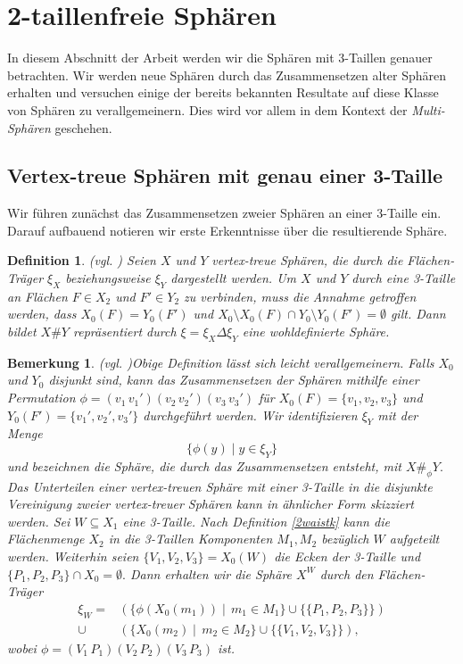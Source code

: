 \documentclass[12pt,titlepage,twoside,cleardoublepage]{article}
\theoremstyle{nummermitklammern}
\newtheorem{definition}[temp]{Definition}
\newtheorem{bemerkung}[temp]{Bemerkung}
\newtheorem{definition}[zahl]{Definition}
\newtheorem{bemerkung}[zahl]{Bemerkung}
\numberwithin{equation}{section}
\begin{document}
 \section{2-taillenfreie Sphären}
In diesem Abschnitt der Arbeit werden wir die Sphären mit 3-Taillen genauer betrachten. Wir werden neue Sphären durch das Zusammensetzen alter Sphären erhalten und versuchen einige der bereits bekannten Resultate auf diese Klasse von Sphären zu verallgemeinern. Dies wird vor allem in dem Kontext der \emph{Multi-Sphären} geschehen.
\subsection{Vertex-treue Sphären mit genau einer 3-Taille}
Wir führen zunächst das Zusammensetzen zweier Sphären an einer 3-Taille ein. Darauf aufbauend notieren wir erste Erkenntnisse über die resultierende Sphäre. 
\begin{definition}{\textsc{(}vgl. \textsc{\cite{simp})}}
Seien $X$ und $Y$ vertex-treue Sphären, die durch die Flächen-Träger $\xi_X$ beziehungsweise $\xi_Y$ dargestellt werden. Um $X$ und $Y$ durch eine 3-Taille an Flächen $F\in X_2$ und $F'\in Y_2$ zu verbinden, muss die Annahme getroffen werden, dass
$X_0(F)=Y_0(F')$ und $X_0\setminus X_0(F)\cap Y_0\setminus Y_0(F')=\emptyset$ gilt. Dann bildet $X\#Y$ repräsentiert durch $\xi=\xi_X \Delta \xi_Y$ eine wohldefinierte Sphäre.
\end{definition}
\begin{bemerkung}{\textsc{(}vgl. \textsc{\cite{simp})}}\label{3waist}
Obige Definition lässt sich leicht verallgemeinern. Falls $X_0$ und $Y_0$ disjunkt sind, kann das Zusammensetzen der Sphären mithilfe einer Permutation $\phi=(v_1\,v_1')(v_2\,v_2')(v_3\,v_3')$ für $X_0(F)=\{v_1,v_2,v_3\}$ und $Y_0(F')=\{v_1',v_2',v_3'\}$ durchgeführt werden. Wir identifizieren $\xi_Y$ mit der Menge  
\[
\{\phi (y)\mid y\in \xi_Y \}
\]
und bezeichnen die Sphäre, die durch das Zusammensetzen  entsteht, mit $X\#_{\phi}Y.$\\
Das Unterteilen einer vertex-treuen Sphäre mit einer 3-Taille in die disjunkte Vereinigung zweier vertex-treuer Sphären kann in ähnlicher Form skizziert werden. Sei $W\subseteq X_1$ eine 3-Taille. Nach Definition \ref{2waistk} kann die Flächenmenge $X_2$ in die 3-Taillen Komponenten $M_1,M_2$ bezüglich $W$ aufgeteilt werden. Weiterhin seien $\{V_1,V_2,V_3\}=X_0(W)$ die Ecken der 3-Taille und $\{P_1,P_2,P_3\}\cap X_0=\emptyset.$ Dann erhalten wir die Sphäre $X^W$ durch den Flächen-Träger 
\begin{align*}
\xi_W=&(\{\phi(X_0(m_1))\mid \, m_1\in M_1\}\cup \{\{P_1,P_2,P_3\}\}) \\
 \cup &(\{X_0(m_2)\mid \, m_2\in M_2\}\cup \{\{V_1,V_2,V_3\}\}),
\end{align*}
wobei $\phi=(V_1\,P_1)(V_2\,P_2)(V_3\,P_3)$ ist.
\end{bemerkung}
\end{document}
